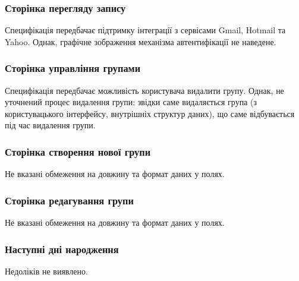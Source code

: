 \documentclass[a4paper,oneside,12pt,DIV=12,titlepage,toc]{scrartcl}
\begin{document}
			\subsubsection{Сторінка перегляду запису}
				Специфікація передбачає підтримку інтеграції з сервісами Gmail, Hotmail та Yahoo. Однак, графічне зображення механізма автентифікації не наведене. 
				
			\subsubsection{Сторінка управління групами}
				Специфікація передбачає можливість користувача видалити групу. Однак, не уточнений процес видалення групи: звідки саме видаляється група (з користувацького інтерфейсу, внутрішніх структур даних), що саме відбувається під час видалення групи.
				
			\subsubsection{Сторінка створення нової групи}
				Не вказані обмеження на довжину та формат даних у полях.
				
			\subsubsection{Сторінка редагування групи}
				Не вказані обмеження на довжину та формат даних у полях. 
				
			\subsubsection{Наступні дні народження}
				Недоліків не виявлено.
				
\end{document}
